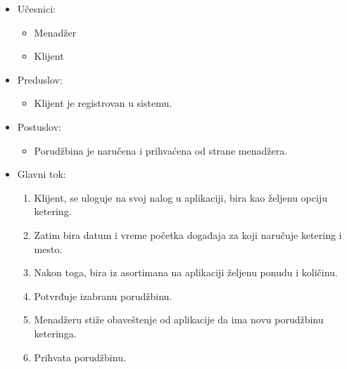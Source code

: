 \documentclass[a4paper]{article}
\begin{document}
  \begin{itemize}
        \item Učesnici:
         \begin{itemize}
        \item Menadžer
    \end{itemize}
          \begin{itemize}
        \item Klijent
    \end{itemize}
    
    \end{itemize}
      \begin{itemize}
        \item Preduslov:
          \begin{itemize}
        \item Klijent je registrovan u sistemu.
       
   \end{itemize}
    
    \end{itemize}
      \begin{itemize}
        \item Postuslov:
          \begin{itemize}
        \item Porudžbina je naručena i prihvaćena od strane menadžera.
    \end{itemize}
    \end{itemize}
      \begin{itemize}
        \item Glavni tok:
          \begin{enumerate}
          
              \item Klijent, se uloguje na svoj nalog u aplikaciji, bira kao željenu opciju ketering.
              
              \item Zatim bira datum i vreme početka događaja za koji naručuje ketering i mesto.
          
              \item Nakon toga, bira iz asortimana na aplikaciji željenu ponudu i količinu.
              
              \item Potvrđuje izabranu porudžbinu.
        
              \item Menadžeru stiže obaveštenje od aplikacije da ima novu porudžbinu keteringa.
         
              \item Prihvata porudžbinu.
      
          \end{enumerate}
    \end{itemize}
    
\end{document}

